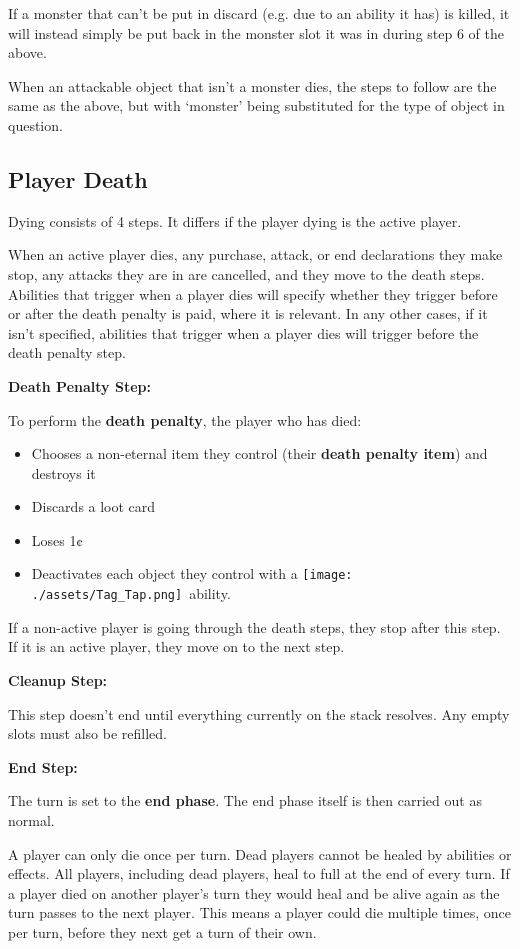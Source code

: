 \documentclass[10pt, a4paper, twoside]{article} %
\newcommand{\tap}{\texttt{[image: ./assets/Tag\_Tap.png]}}
\begin{document}
    If a monster that can’t be put in discard (e.g. due to an ability it has) is killed, it will instead simply be put back in the monster slot it was in during step 6 of the above.

    When an attackable object that isn’t a monster dies, the steps to follow are the same as the above, but with ‘monster’ being substituted for the type of object in question.

    \subsection{Player Death}
    Dying consists of 4 steps. It differs if the player dying is the active player.

    When an active player dies, any purchase, attack, or end declarations they make stop, any attacks they are in are cancelled, and they move to the death steps. Abilities that trigger when a player dies will specify whether they trigger before or after the death penalty is paid, where it is relevant. In any other cases, if it isn’t specified, abilities that trigger when a player dies will trigger before the death penalty step.

    \textbf{Death Penalty Step:}

    To perform the \textbf{death penalty}, the player who has died:
    \begin{itemize}
        \item Chooses a non-eternal item they control (their \textbf{death penalty item}) and destroys it
        \item Discards a loot card
        \item Loses 1¢
        \item Deactivates each object they control with a \tap\ ability.
    \end{itemize}
    If a non-active player is going through the death steps, they stop after this step. If it is an active player, they move on to the next step.

    \textbf{Cleanup Step:}

    This step doesn’t end until everything currently on the stack resolves. Any empty slots must also be refilled.

    \textbf{End Step:}

    The turn is set to the \textbf{end phase}. The end phase itself is then carried out as normal.

    A player can only die once per turn. Dead players cannot be healed by abilities or effects. All players, including dead players, heal to full at the end of every turn. If a player died on another player’s turn they would heal and be alive again as the turn passes to the next player. This means a player could die multiple times, once per turn, before they next get a turn of their own.
\end{document}
